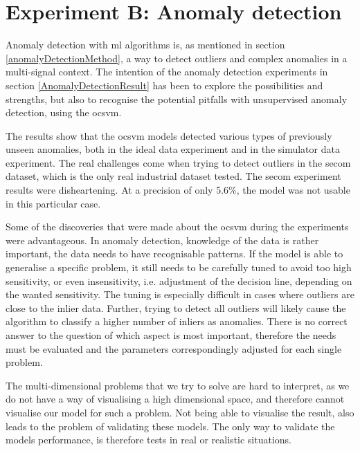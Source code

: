 \documentclass[english, a4paper]{report}
\begin{document}
{    \section{Experiment B: Anomaly detection}
    {
        Anomaly detection with \gls{ml} algorithms is, as mentioned in section \ref{anomalyDetectionMethod}, a way to detect outliers and complex anomalies in a multi-signal context. The intention of the anomaly detection experiments in section \ref{AnomalyDetectionResult} has been to explore the possibilities and strengths, but also to recognise the potential pitfalls with unsupervised anomaly detection, using the \gls{ocsvm}.
        \par
        The results show that the \gls{ocsvm} models detected various types of previously unseen anomalies, both in the ideal data experiment and in the simulator data experiment. The real challenges come when trying to detect outliers in the \gls{secom} dataset, which is the only real industrial dataset tested. The \gls{secom} experiment results were disheartening. At a precision of only 5.6\%, the model was not usable in this particular case.
        \par
        Some of the discoveries that were made about the \gls{ocsvm} during the experiments were advantageous. In anomaly detection, knowledge of the data is rather important, the data needs to have recognisable patterns. If the model is able to generalise a specific problem, it still needs to be carefully tuned to avoid too high sensitivity, or even insensitivity, i.e. adjustment of the decision line, depending on the wanted sensitivity. The tuning is especially difficult in cases where outliers are close to the inlier data. Further, trying to detect all outliers will likely cause the algorithm to classify a higher number of inliers as anomalies. There is no correct answer to the question of which aspect is most important, therefore the needs must be evaluated and the parameters correspondingly adjusted for each single problem.
        \par
        The multi-dimensional problems that we try to solve are hard to interpret, as we do not have a way of visualising a high dimensional space, and therefore cannot visualise our model for such a problem. Not being able to visualise the result, also leads to the problem of validating these models. The only way to validate the models performance, is therefore tests in real or realistic situations. 
    }
    
}
\end{document}
